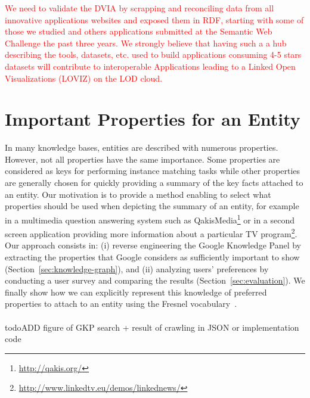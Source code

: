 \textcolor{red}{We need to validate the DVIA by scrapping and reconciling data from all innovative applications websites and exposed them in RDF, starting with some of those we studied and others applications submitted at the Semantic Web Challenge the past three years. We strongly believe that having such a a hub  describing the tools, datasets, etc.  used to build  applications consuming 4-5 stars datasets will contribute to interoperable Applications leading to a Linked Open Visualizations (LOVIZ) on the LOD cloud.}


\section{Important Properties for an Entity}
\label{sec:propEntities}
In many knowledge bases, entities are described with numerous properties. However, not all properties have the same importance. Some properties are considered as keys for performing instance matching tasks while other properties are generally chosen for quickly providing a summary of the key facts attached to an entity. Our motivation is to provide a method enabling to select what properties should be used when depicting the summary of an entity, for example in a multimedia question answering system such as QakisMedia\footnote{\url{http://qakis.org/}} or in a second screen application providing more information about a particular TV program\footnote{\url{http://www.linkedtv.eu/demos/linkednews/}}. Our approach consists in: (i) reverse engineering the Google Knowledge Panel by extracting the properties that Google considers as sufficiently important to show (Section~\ref{sec:knowledge-graph}), and (ii) analyzing users' preferences by conducting a user survey and comparing the results (Section~\ref{sec:evaluation}). We finally show how we can explicitly represent this knowledge of preferred properties to attach to an entity using the Fresnel vocabulary~\cite{pietriga2006}. \\
\\todo{ADD figure of GKP search + result of crawling in JSON or implementation code}


